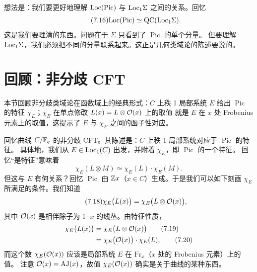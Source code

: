 想法是：我们要更好地理解 $\mathrm{Loc}(\operatorname{Pic})$ 与 $\mathrm{Loc}_1\Sigma$ 之间的关系。回忆
\begin{equation}\tag{7.16}\label{eq:7.16}
\mathrm{Loc}(\operatorname{Pic})\simeq\mathrm{QC}(\mathrm{Loc}_1\Sigma).
\end{equation}
这是我们要理清的东西。问题在于 $\Sigma$ 只看到了 $\operatorname{Pic}$ 的单个分量。
但要理解 $\mathrm{Loc}_1\Sigma$，我们必须把不同的分量联系起来。这正是几何类域论的陈述要说的。


\section{回顾：非分歧 CFT}

\begin{sectionkey}
本节回顾非分歧类域论在函数域上的经典形式：$C$ 上秩 1 局部系统 $E$ 给出
$\operatorname{Pic}$ 的特征 $\chi_E$；$\chi_E$ 在单点修改 $L(x)=L\otimes\mathcal{O}(x)$ 上的取值
就是 $E$ 在 $x$ 处 Frobenius 元素上的取值，这提示了 $E$ 与 $\chi_E$ 之间的函子性对应。
\end{sectionkey}

回忆曲线 $C/\mathbb{F}_q$ 的非分歧 CFT。其陈述是：$C$ 上秩 1 局部系统对应于 $\operatorname{Pic}$ 的特征。
具体地，我们从 $E\in\mathrm{Loc}_1(C)$ 出发，并附着 $\chi_E$，即 $\operatorname{Pic}$ 的一个特征。
回忆“是特征”意味着
\begin{equation}\tag{7.17}\label{eq:7.17}
\chi_E(L\otimes M)\simeq\chi_E(L)\cdot\chi_E(M).
\end{equation}
但这与 $E$ 有何关系？回忆 $\operatorname{Pic}$ 由 $\mathbb{Z} x$（$x\in C$）生成。于是我们可以如下刻画
$\chi_E$ 所满足的条件。我们知道
\begin{equation}\tag{7.18}\label{eq:7.18}
\chi_E\bigl(L(x)\bigr)=\chi_E\bigl(L\otimes\mathcal{O}(x)\bigr),
\end{equation}
其中 $\mathcal{O}(x)$ 是相伴除子为 $1\cdot x$ 的线丛。由特征性质，
\begin{align}
\chi_E\bigl(L(x)\bigr)&=\chi_E\bigl(L\otimes\mathcal{O}(x)\bigr)\tag{7.19}\label{eq:7.19}\\
&=\chi_E\bigl(\mathcal{O}(x)\bigr)\cdot\chi_E(L),\tag{7.20}\label{eq:7.20}
\end{align}
而这个数 $\chi_E(\mathcal{O}(x))$ 应该是局部系统 $E$ 在 $\mathrm{Fr}_x$（$x$ 处的 Frobenius 元素）上的值。
注意 $\mathcal{O}(x)=\operatorname{AJ}(x)$，故值 $\chi_E(\mathcal{O}(x))$ 确实是关于曲线的某种东西。

